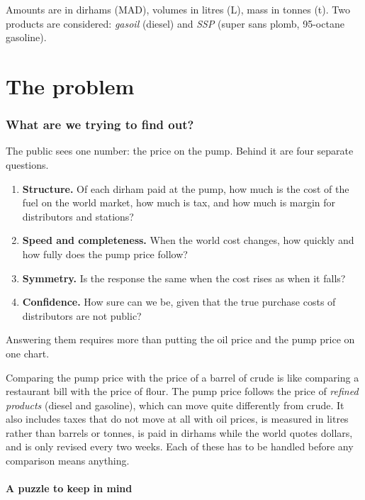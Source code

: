 \documentclass[11pt,a4paper]{article}
\theoremstyle{definition}
\begin{document}
Amounts are in dirhams (MAD), volumes in litres (L), mass in tonnes (t). Two products are
considered: \emph{gasoil} (diesel) and \emph{SSP} (super sans plomb, 95-octane gasoline).

\part{The problem}

\section{What are we trying to find out?}

The public sees one number: the price on the pump. Behind it are four separate questions.

\begin{enumerate}[label=\textbf{Q\arabic*.},leftmargin=3em]
\item \textbf{Structure.} Of each dirham paid at the pump, how much is the cost of the fuel on
  the world market, how much is tax, and how much is margin for distributors and stations?
\item \textbf{Speed and completeness.} When the world cost changes, how quickly and how fully does the
  pump price follow?
\item \textbf{Symmetry.} Is the response the same when the cost rises as when it falls?
\item \textbf{Confidence.} How sure can we be, given that the true purchase costs of
  distributors are not public?
\end{enumerate}

Answering them requires more than putting the oil price and the pump price on one chart.

\begin{intuition}
Comparing the pump price with the price of a barrel of crude is like comparing a restaurant
bill with the price of flour. The pump price follows the price of \emph{refined products}
(diesel and gasoline), which can move quite differently from crude. It also includes taxes
that do not move at all with oil prices, is measured in litres rather than barrels or tonnes,
is paid in dirhams while the world quotes dollars, and is only revised every two weeks.
Each of these has to be handled before any comparison means anything.
\end{intuition}

\subsection*{A puzzle to keep in mind}
\end{document}
